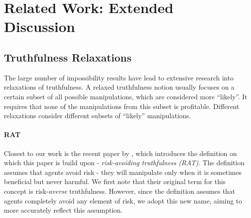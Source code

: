 
\section{Related Work: Extended Discussion}\label{apx:related}

\iffalse
\subsection{Impossibility Results}
There is a large number of impossibility results regarding truthfulness alongside other desirable properties. \eden{todo }

\textbf{voting:}
With three or more candidates, the Gibbard--Satterthwaite Theorem~\cite{gibbard1973manipulation,satterthwaite1975strategy} implies that the only \eden{efficient?} truthful rules are dictatorships. 
\fi





\subsection{Truthfulness Relaxations}

The large number of impossibility results have lead to extensive research into relaxations of truthfulness. 
A relaxed truthfulness notion usually focuses on a certain subset of all possible manipulations, which are considered more ``likely''. It requires that none of the manipulations from this subset is profitable. Different relaxations consider different subsets of ``likely'' manipulations.





\paragraph{RAT}
Closest to our work is the recent paper by \cite{BU2023Rat}, which introduces the definition on which this paper is build upon - \emph{risk-avoiding truthfulness (RAT)}. 
The definition assumes that agents avoid risk - they will manipulate only when it is sometimes beneficial but never harmful. 
We first note that their original term for this concept is risk-\emph{averse} truthfulness. However, since the definition assumes that agents completely avoid any element of risk, we adopt this new name, aiming to more accurately reflect this assumption.

